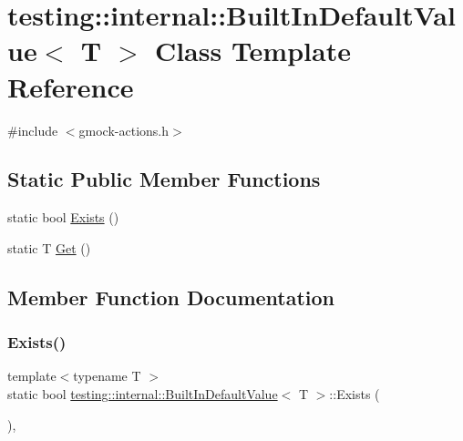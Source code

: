 \hypertarget{classtesting_1_1internal_1_1_built_in_default_value}{}\section{testing\+:\+:internal\+:\+:Built\+In\+Default\+Value$<$ T $>$ Class Template Reference}
\label{classtesting_1_1internal_1_1_built_in_default_value}


{\ttfamily \#include $<$gmock-\/actions.\+h$>$}

\subsection*{Static Public Member Functions}
\begin{DoxyCompactItemize}
\item 
static bool \hyperlink{classtesting_1_1internal_1_1_built_in_default_value_a35207bc20a493b0efb3980eb9a08dd2f}{Exists} ()
\item 
static T \hyperlink{classtesting_1_1internal_1_1_built_in_default_value_a7e26c1df14a887c8f393b29d6ea162e6}{Get} ()
\end{DoxyCompactItemize}


\subsection{Member Function Documentation}
\mbox{\label{classtesting_1_1internal_1_1_built_in_default_value_a35207bc20a493b0efb3980eb9a08dd2f}} 
\subsubsection{\texorpdfstring{Exists()}{Exists()}}
{\footnotesize\ttfamily template$<$typename T $>$ \\
static bool \hyperlink{classtesting_1_1internal_1_1_built_in_default_value}{testing\+::internal\+::\+Built\+In\+Default\+Value}$<$ T $>$\+::Exists (\begin{DoxyParamCaption}{ }\end{DoxyParamCaption})\hspace{0.3cm}{\ttfamily [inline]}, {\ttfamily [static]}}

